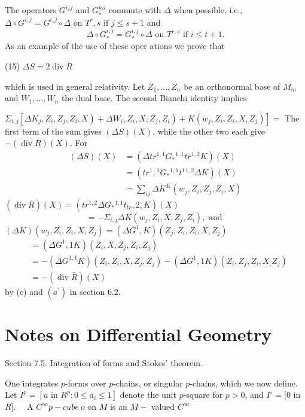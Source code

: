 \documentclass[10pt]{article}
\begin{document}
The operators $G^{i_{1} j}$ and $G_{*}^{i_{0} j}$ commute with $\Delta$ when possible, i.e., $\Delta \circ G^{i, j}=G^{i, j} \circ \Delta$ on $T^{r}, s$ if $j \leq s+1$ and
$$
\Delta \circ G_{*}^{i, j}=G_{*}^{i, j} \circ \Delta \text { on } T^{r, s} \text { if } i \leq t+1 .
$$
As an example of the use of these oper ations we prove that

(15) $\Delta S=2 \operatorname{div} \bar{R}$

which is used in general relativity. Let $Z_{1}, \ldots, Z_{n}$ be an orthonormal base of $M_{m}$ and $W_{1}, \ldots, W_{n}$ the dual base. The second Bianchi identity implies

$\left.\left.\Sigma_{i, j}\left[\Delta K_{j}, Z_{i}, Z_{j}, Z_{i}, X\right)+\Delta W_{i}, Z_{i}, X, Z_{j}, Z_{i}\right)+K\left(w_{j}, Z_{i}, Z_{i}, X, Z_{j}\right)\right]=$ The first term of the sum gives $(\Delta S)(X)$, while the other two each give $-(\operatorname{div} R)(X)$. For
$$
\begin{aligned}
(\Delta S)(X) &=\left(\Delta t r^{1,1} G_{*}{ }^{1,1} t r^{1,2} K\right)(X) \\
&=\left(t r^{1},{ }^{1} G_{*}{ }^{1,1} t^{1}{ }^{1,2} \Delta K\right)(X) \\
&=\sum_{i j} \Delta K^{K}\left(w_{j}, Z_{i}, Z_{j}, Z_{i}, X\right)
\end{aligned}
$$
$(\operatorname{div} \bar{R})(X)=\left(t r^{1,2} \Delta G_{*}{ }^{1,1} t_{t r}, 2, K\right)(X)$
$$
=-\Sigma_{i, j} \Delta K\left(w_{j}, Z_{i}, X, Z_{j}, Z_{i}\right), \text { and }
$$
$(\Delta K)\left(w_{j}, Z_{i}, Z_{i}, X, Z_{j}\right)=\left(\Delta G^{1}, K\right)\left(Z_{j}, Z_{i}, Z_{i}, X, Z_{j}\right)$
$$
\begin{aligned}
&=\left(\Delta G^{1}, 1 K\right)\left(Z_{i}, X, Z_{j}, Z_{i}, Z_{j}\right) \\
&=-\left(\Delta G^{1,1} K\right)\left(Z_{i}, Z_{i}, X, Z_{j}, Z_{j}\right)-\left(\Delta G^{1}, 1 K\right)\left(Z_{i}, Z_{j}, Z_{i}, X_{,} Z_{j}\right) \\
&=-(\operatorname{div} \bar{R})(X)
\end{aligned}
$$
by (c) and $\left(a^{\prime}\right)$ in section 6.2.

\section{Notes on Differential Geometry}
Section 7.5. Integration of forms and Stokes' theorem.

One integrates $p$-forms over $p$-chains, or singular $p$-chains, which we now define. Let $I^{p}=\left[a\right.$ in $\left.R^{p}: 0 \leq a_{i} \leq 1\right]$ denote the unit $p$-square for $p>0$, and $I^{\circ}=[0$ in $R] . \quad$ A $C^{\infty} p-c u b e ~ o$ on $M$ is an $M-$ valued $C^{\infty}$
\end{document}

